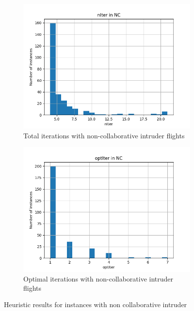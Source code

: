 \documentclass[../../thesis.tex]{subfiles}
\begin{document}
\begin{figure}[ht]
    \centering
    \begin{subfigure}{0.49\textwidth}
        \centering
        \includegraphics[width=\linewidth]{thesis/picture/heuristic/nIter_histogram_NC.png}
        \caption{Total iterations with non-collaborative intruder flights}
        \label{fig:heurNC:nIter}
    \end{subfigure}
    \hfill
    \begin{subfigure}{0.49\textwidth}
        \centering
        \includegraphics[width=\linewidth]{thesis/picture/heuristic/optIter_histogram_NC.png}
        \caption{Optimal iterations with non-collaborative intruder flights}
        \label{fig:heurNC:optIter}
    \end{subfigure}
    \caption{Heuristic results for instances with non collaborative intruder}
    \label{fig:heur:NC}
\end{figure}
\end{document}
